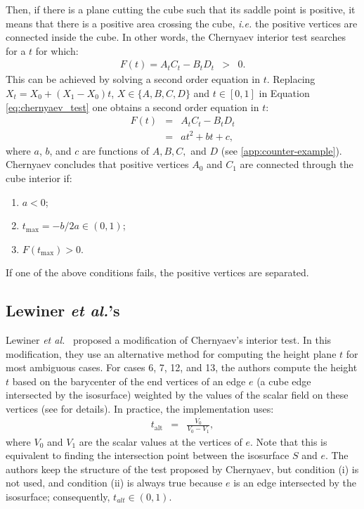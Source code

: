 Then, if there is a plane cutting the cube such that its saddle point is positive, it means that there is a positive area crossing the cube,  \emph{i.e.}  the positive vertices are connected inside the cube.  In other words, the Chernyaev interior test searches for a $t$ for which:
\begin{eqnarray}
F(t) = A_tC_t-B_tD_t &>& 0. \label{eq:chernyaev_test}
\end{eqnarray}
This can be achieved by solving a second order equation in $t$. Replacing $X_t = X_0 + (X_1-X_0)t$,  $X \in \{A, B, C, D\}$ and $t \in [0,1]$ in Equation \eqref{eq:chernyaev_test} one obtains a second order equation in $t$:
\begin{eqnarray}
F(t) &=& A_tC_t-B_tD_t\\
       &=& a t^2 + b t + c  \label{eq:disambiguation},
\end{eqnarray}
where $a$, $b$, and $c$ are functions of $A, B, C,$ and $D$ (see \ref{app:counter-example}). Chernyaev concludes that positive vertices $A_0$ and $C_1$ are connected through the cube interior if: 
\begin{enumerate}
\item $a < 0$;
\item $t_{\mathrm{max}} = -b / 2a \in (0,1)$; 
\item $F(t_{\mathrm{max}}) > 0$. 
\end{enumerate}
If one of the above conditions fails, the positive vertices are separated.

\subsection{Lewiner \emph{et al.}'s \mc{}}

Lewiner \emph{et al.}~\cite{Lewiner:2003} proposed a modification of Chernyaev's interior test. In this modification, they use an alternative method for computing the height plane $t$ for most ambiguous cases. For cases  6, 7, 12, and 13, the authors compute the height $t$ based on the barycenter of the end vertices of an edge $e$ (a cube edge intersected by the isosurface) weighted by the values of the scalar field on these vertices (see \cite{Lewiner:2003} for details). In practice, the implementation uses:
\begin{eqnarray}
t_{\mathrm{alt}} &=& \frac{V_{0}}{V_{0} - V_{1}},\label{eq:alternative}
\end{eqnarray}
where $V_{0}$ and $V_{1}$ are the scalar values at the vertices of $e$. Note that this is equivalent to finding the intersection point between the isosurface $S$ and $e$. The authors keep the structure of the test proposed by Chernyaev, but condition (i) is not used, and condition (ii) is always true because $e$ is an edge intersected by the isosurface; consequently, $t_{alt} \in (0,1)$.

